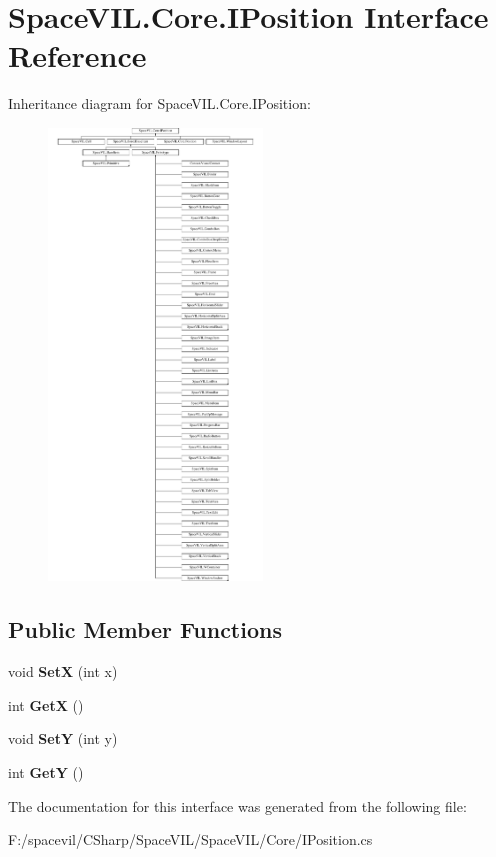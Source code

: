 \hypertarget{interface_space_v_i_l_1_1_core_1_1_i_position}{}\section{Space\+V\+I\+L.\+Core.\+I\+Position Interface Reference}
\label{interface_space_v_i_l_1_1_core_1_1_i_position}
Inheritance diagram for Space\+V\+I\+L.\+Core.\+I\+Position\+:\begin{figure}[H]
\begin{center}
\leavevmode
\includegraphics[height=12.000000cm]{interface_space_v_i_l_1_1_core_1_1_i_position}
\end{center}
\end{figure}
\subsection*{Public Member Functions}
\begin{DoxyCompactItemize}
\item 
\mbox{\label{interface_space_v_i_l_1_1_core_1_1_i_position_a9a98baa12afe5da8cdc553d0ce25369f}} 
void {\bfseries SetX} (int x)
\item 
\mbox{\label{interface_space_v_i_l_1_1_core_1_1_i_position_a67fb53a55aadf1038903346778b41318}} 
int {\bfseries GetX} ()
\item 
\mbox{\label{interface_space_v_i_l_1_1_core_1_1_i_position_afdecfb9237eb56c074b391fc2ad8fe5b}} 
void {\bfseries SetY} (int y)
\item 
\mbox{\label{interface_space_v_i_l_1_1_core_1_1_i_position_a2d11f35d825eba597abb021e7f146f06}} 
int {\bfseries GetY} ()
\end{DoxyCompactItemize}


The documentation for this interface was generated from the following file\+:\begin{DoxyCompactItemize}
\item 
F\+:/spacevil/\+C\+Sharp/\+Space\+V\+I\+L/\+Space\+V\+I\+L/\+Core/I\+Position.\+cs\end{DoxyCompactItemize}
